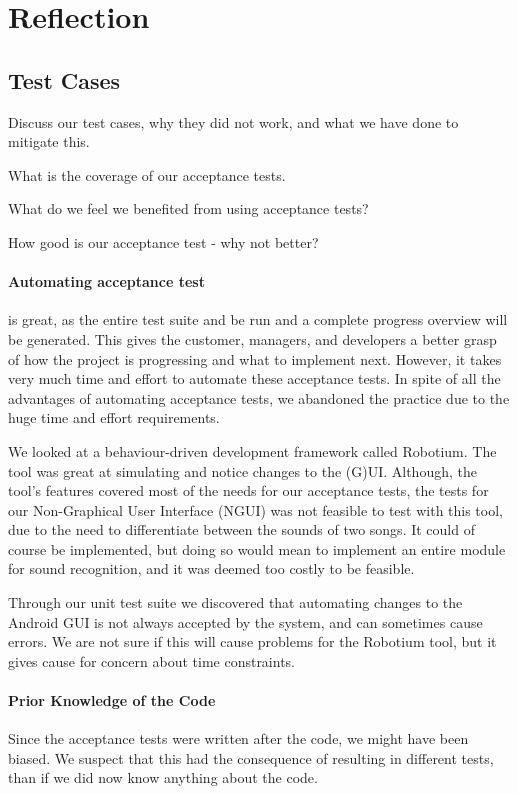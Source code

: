 \section{Reflection}
\subsection{Test Cases}
Discuss our test cases, why they did not work, and what we have done to mitigate this.

What is the coverage of our acceptance tests.

What do we feel we benefited from using acceptance tests?

How good is our acceptance test - why not better?

\paragraph{Automating acceptance test} is great, as the entire test suite and be run and a complete progress overview will be generated.
This gives the customer, managers, and developers a better grasp of how the project is progressing and what to implement next.
However, it takes very much time and effort to automate these acceptance tests.
In spite of all the advantages of automating acceptance tests, we abandoned the practice due to the huge time and effort requirements.

We looked at a behaviour-driven development framework called Robotium.
The tool was great at simulating and notice changes to the (G)UI.
Although, the tool's features covered most of the needs for our acceptance tests, the tests for our Non-Graphical User Interface (NGUI) was not feasible to test with this tool, due to the need to differentiate between the sounds of two songs.
It could of course be implemented, but doing so would mean to implement an entire module for sound recognition, and it was deemed too costly to be feasible. 

Through our unit test suite we discovered that automating changes to the Android GUI is not always accepted by the system, and can sometimes cause errors.
We are not sure if this will cause problems for the Robotium tool, but it gives cause for concern about time constraints.





\paragraph{Prior Knowledge of the Code}
Since the acceptance tests were written after the code, we might have been biased. We suspect that this had the consequence of resulting in different tests, than if we did now know anything about the code. 

